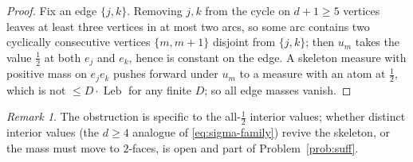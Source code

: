 \documentclass[11pt,reqno]{amsart}
\theoremstyle{plain}
\theoremstyle{definition}
\theoremstyle{remark}
\newtheorem{remark}[theorem]{Remark}
\newcommand{\Leb}{\operatorname{Leb}}
\begin{document}
\begin{proof}
Fix an edge $\{j,k\}$. Removing $j,k$ from the cycle on $d+1\ge5$ vertices
leaves at least three vertices in at most two arcs, so some arc contains two
cyclically consecutive vertices $\{m,m+1\}$ disjoint from $\{j,k\}$; then $u_m$
takes the value $\tfrac12$ at both $e_j$ and $e_k$, hence is constant on the
edge. A skeleton measure with positive mass on $e_je_k$ pushes forward under
$u_m$ to a measure with an atom at $\tfrac12$, which is not $\le D\cdot\Leb$ for
any finite $D$; so all edge masses vanish.
\end{proof}

\begin{remark}
The obstruction is specific to the all-$\tfrac12$ interior values; whether
distinct interior values (the $d\ge4$ analogue of
\eqref{eq:sigma-family}) revive the skeleton, or the mass must move to
$2$-faces, is open and part of Problem~\ref{prob:suff}.
\end{remark}
\end{document}
